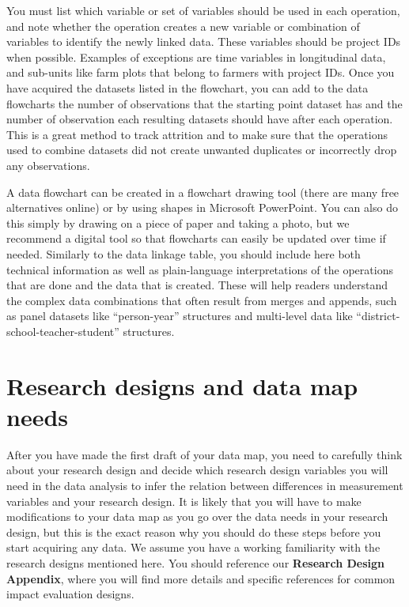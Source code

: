 You must list which variable or set of variables
should be used in each operation,
and note whether the operation creates a new variable or combination of variables
to identify the newly linked data.
These variables should be project IDs when possible.
Examples of exceptions are time variables in longitudinal data,
and sub-units like farm plots that belong to farmers with project IDs.
Once you have acquired the datasets listed in the flowchart,
you can add to the data flowcharts the number of observations that
the starting point dataset has
and the number of observation each resulting datasets
should have after each operation.
This is a great method to track attrition and to make sure that
the operations used to combine datasets did not create unwanted duplicates
or incorrectly drop any observations.

A data flowchart can be created in a flowchart drawing tool
(there are many free alternatives online) or
by using shapes in Microsoft PowerPoint.
You can also do this simply by drawing on a piece of paper and taking a photo,
but we recommend a digital tool
so that flowcharts can easily be updated over time if needed.
Similarly to the data linkage table,
you should include here both technical information
as well as plain-language interpretations
of the operations that are done and the data that is created.
These will help readers understand the complex data combinations
that often result from merges and appends,
such as panel datasets like ``person-year'' structures
and multi-level data like ``district-school-teacher-student'' structures.

\section{Research designs and data map needs}

After you have made the first draft of your data map,
you need to carefully think about your research design
and decide which research design variables you will need in the data analysis
to infer the relation between differences in measurement variables
and your research design.
It is likely that you will have to make modifications
to your data map as you go over the data needs in your research design,
but this is the exact reason why you should do these steps
before you start acquiring any data.
We assume you have a working familiarity
with the research designs mentioned here.
You should reference our \textbf{Research Design Appendix},
where you will find more details
and specific references for common impact evaluation designs.

